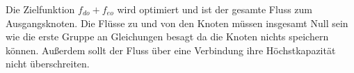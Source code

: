 	Die Zielfunktion $f_{do}+f_{eo}$ wird optimiert und ist der gesamte Fluss zum Ausgangsknoten. Die Flüsse zu und von den Knoten müssen insgesamt Null sein wie die erste Gruppe an Gleichungen besagt da die Knoten nichts speichern können. Außerdem sollt der Fluss über eine Verbindung ihre Höchstkapazität nicht überschreiten.
	
	
	
	
	
	
	